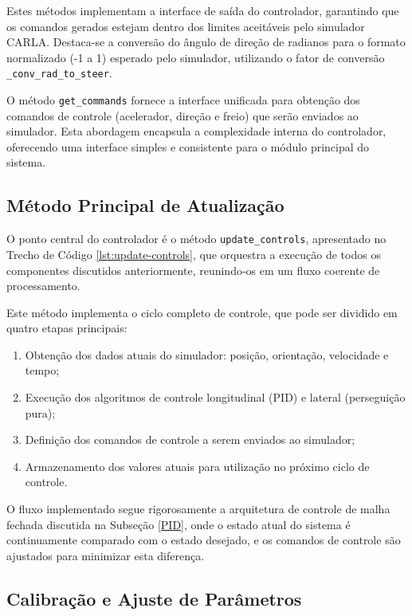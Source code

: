 Estes métodos implementam a interface de saída do controlador, garantindo que os comandos gerados estejam dentro dos limites aceitáveis pelo simulador CARLA. Destaca-se a conversão do ângulo de direção de radianos para o formato normalizado (-1 a 1) esperado pelo simulador, utilizando o fator de conversão \texttt{\_conv\_rad\_to\_steer}.

O método \texttt{get\_commands} fornece a interface unificada para obtenção dos comandos de controle (acelerador, direção e freio) que serão enviados ao simulador. Esta abordagem encapsula a complexidade interna do controlador, oferecendo uma interface simples e consistente para o módulo principal do sistema.

\subsection{Método Principal de Atualização}

O ponto central do controlador é o método \texttt{update\_controls}, apresentado no Trecho de Código \ref{lst:update-controls}, que orquestra a execução de todos os componentes discutidos anteriormente, reunindo-os em um fluxo coerente de processamento.

Este método implementa o ciclo completo de controle, que pode ser dividido em quatro etapas principais:

\begin{enumerate}
    \item Obtenção dos dados atuais do simulador: posição, orientação, velocidade e tempo;
    \item Execução dos algoritmos de controle longitudinal (PID) e lateral (perseguição pura);
    \item Definição dos comandos de controle a serem enviados ao simulador;
    \item Armazenamento dos valores atuais para utilização no próximo ciclo de controle.
\end{enumerate}

O fluxo implementado segue rigorosamente a arquitetura de controle de malha fechada discutida na Subseção \ref{PID}, onde o estado atual do sistema é continuamente comparado com o estado desejado, e os comandos de controle são ajustados para minimizar esta diferença.

\subsection{Calibração e Ajuste de Parâmetros}

